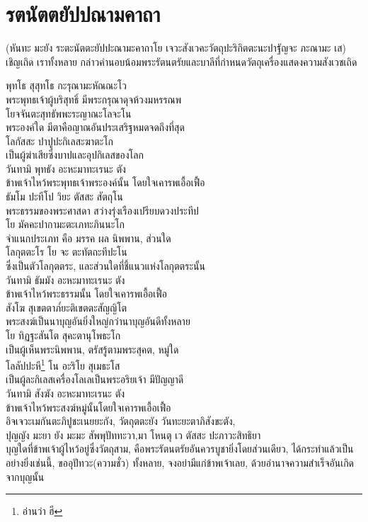 \documentclass{article}
\begin{document}
\section{รตนัตตยัปปณามคาถา}
\begin{center}
(หันทะ มะยัง ระตะนัตตะยัปปะณามะคาถาโย เจวะสังเวคะวัตถุปะริกิตตะนะปาฐัญจะ ภะณามะ เส)\\เชิญเถิด เราทั้งหลาย กล่าวคำนอบน้อมพระรัตนตรัยและบาลีที่กำหนดวัตถุเครื่องแสดงความสังเวชเถิด
\end{center}
พุทโธ สุสุทโธ กะรุณามะหัณณะโว\\
\indent พระพุทธเจ้าผู้บริสุทธิ์ มีพระกรุณาดุจห้วงมหรรณพ\\
โยจจันตะสุทธัพพะระญาณะโลจะโน\\
\indent พระองค์ใด มีตาคือญาณอันประเสริฐหมดจดถึงที่สุด\\
โลกัสสะ ปาปูปะกิเลสะฆาตะโก\\
\indent เป็นผู้ฆ่าเสียซึ่งบาปและอุปกิเลสของโลก\\
วันทามิ พุทธัง อะหะมาทะเรนะ ตัง\\
\indent ข้าพเจ้าไหว้พระพุทธเจ้าพระองค์นั้น โดยใจเคารพเอื้อเฟื้อ\\
ธัมโม ปะทีโป วิยะ ตัสสะ สัตถุโน\\
\indent พระธรรมของพระศาสดา สว่างรุ่งเรืองเปรียบดวงประทีป\\
โย มัคคะปากามะตะเภทะภินนะโก\\
\indent จำแนกประเภท คือ มรรค ผล นิพพาน, ส่วนใด\\
โลกุตตะโร โย จะ ตะทัตถะทีปะโน\\
\indent ซึ่งเป็นตัวโลกุตตระ, และส่วนใดที่ชี้แนวแห่งโลกุตตระนั้น\\
วันทามิ ธัมมัง อะหะมาทะเรนะ ตัง\\
\indent ข้าพเจ้าไหว้พระธรรมนั้น โดยใจเคารพเอื้อเฟื้อ\\
สังโฆ สุเขตตาภ๎ยะติเขตตะสัญญิโต\\
\indent พระสงฆ์เป็นนาบุญอันยิ่งใหญ่กว่านาบุญอันดีทั้งหลาย\\
โย ทิฏฐะสันโต สุคะตานุโพธะโก\\
\indent เป็นผู้เห็นพระนิพพาน, ตรัสรู้ตามพระสุคต, หมู่ใด\\
โลลัปปะหี\footnote{อ่านว่า ฮี} โน อะริโย สุเมธะโส\\
\indent เป็นผู้ละกิเลสเครื่องโลเลเป็นพระอริยเจ้า มีปัญญาดี\\
วันทามิ สังฆัง อะหะมาทะเรนะ ตัง\\
\indent ข้าพเจ้าไหว้พระสงฆ์หมู่นั้นโดยใจเคารพเอื้อเฟื้อ\\
อิจเจวะเมกันตะภิปูชะเนยยะกัง, วัตถุตตะยัง วันทะยะตาภิสังขะตัง,\\
ปุญญัง มะยา ยัง มะมะ สัพพุปัททะวา,มา โหนตุ เว ตัสสะ ปะภาวะสิทธิยา\\
\indent บุญใดที่ข้าพเจ้าผู้ไหว้อยู่ซึ่งวัตถุสาม, คือพระรัตนตรัยอันควรบูชายิ่งโดยส่วนเดียว,
ได้กระทำแล้วเป็นอย่างยิ่งเช่นนี้, ขออุปัทวะ(ความชั่ว) ทั้งหลาย,
จงอย่ามีแก่ข้าพเจ้าเลย, ด้วยอำนาจความสำเร็จอันเกิดจากบุญนั้น
\pagebreak
\end{document}
